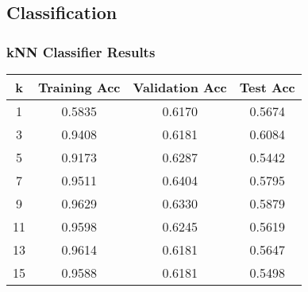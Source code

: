 \documentclass[letter,11pt]{article}
\begin{document}
\subsection{Classification}
\subsubsection{kNN Classifier Results}
\begin{center}
	\begin{tabular}{|c| c |c |c|} 
		\hline
		k & Training Acc & Validation Acc & Test Acc \\ [0.5ex] 
		\hline
		1 & 0.5835 & 0.6170 & 0.5674 \\ 
		\hline
		3 & 0.9408 & 0.6181 & 0.6084 \\
		\hline
		5 & 0.9173 & 0.6287 & 0.5442 \\
		\hline
		7 & 0.9511 & 0.6404 & 0.5795 \\
		\hline
		9 & 0.9629 & 0.6330 & 0.5879 \\
		\hline
		11 & 0.9598 & 0.6245 & 0.5619 \\
		\hline
		13 & 0.9614 & 0.6181 & 0.5647 \\
		\hline				
		15 & 0.9588 & 0.6181 & 0.5498 \\ [1ex] 
		\hline
	\end{tabular}
\end{center}
\end{document}
